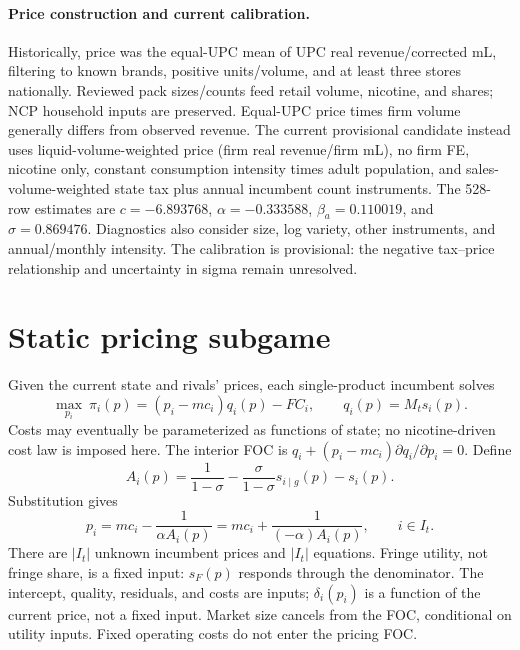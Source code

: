 \documentclass[11pt]{article}
\begin{document}
\paragraph{Price construction and current calibration.} Historically, price was the equal-UPC mean of UPC real revenue/corrected mL, filtering to known brands, positive units/volume, and at least three stores nationally. Reviewed pack sizes/counts feed retail volume, nicotine, and shares; NCP household inputs are preserved. Equal-UPC price times firm volume generally differs from observed revenue. The current provisional candidate instead uses liquid-volume-weighted price (firm real revenue/firm mL), no firm FE, nicotine only, constant consumption intensity times adult population, and sales-volume-weighted state tax plus annual incumbent count instruments. The 528-row estimates are $c=-6.893768$, $\alpha=-0.333588$, $\beta_a=0.110019$, and $\sigma=0.869476$. Diagnostics also consider size, log variety, other instruments, and annual/monthly intensity. The calibration is provisional: the negative tax--price relationship and uncertainty in sigma remain unresolved.

\section{Static pricing subgame}
Given the current state and rivals' prices, each single-product incumbent solves
\begin{equation}\label{eq:profit}
\max_{p_i}\ \pi_i(p)=(p_i-mc_i)q_i(p)-FC_i,\qquad q_i(p)=M_ts_i(p).
\end{equation}
Costs may eventually be parameterized as functions of state; no nicotine-driven cost law is imposed here. The interior FOC is $q_i+(p_i-mc_i)\partial q_i/\partial p_i=0$. Define
\begin{equation}
A_i(p)=\frac{1}{1-\sigma}-\frac{\sigma}{1-\sigma}s_{i\mid g}(p)-s_i(p).
\end{equation}
Substitution gives
\begin{equation}\label{eq:markup}
p_i=mc_i-\frac{1}{\alpha A_i(p)}=mc_i+\frac{1}{(-\alpha)A_i(p)},\qquad i\in I_t.
\end{equation}
There are $|I_t|$ unknown incumbent prices and $|I_t|$ equations. Fringe utility, not fringe share, is a fixed input: $s_F(p)$ responds through the denominator. The intercept, quality, residuals, and costs are inputs; $\delta_i(p_i)$ is a function of the current price, not a fixed input. Market size cancels from the FOC, conditional on utility inputs. Fixed operating costs do not enter the pricing FOC.
\end{document}
